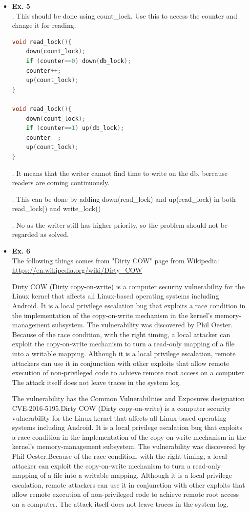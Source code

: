 \documentclass{article}
\begin{document}
\begin{itemize}
{\noindent }
\item {\bf Ex. 5}\\

{. This should be done using count\_lock. Use this to access the counter and change it for reading.}

\begin{lstlisting}[language=C]
void read_lock(){
    down(count_lock);
    if (counter==0) down(db_lock);
    counter++;
    up(count_lock);      
}

void read_lock(){
    down(count_lock);
    if (counter==1) up(db_lock);
    counter--;
    up(count_lock);      
}


\end{lstlisting}
{. It means that the writer cannot find time to write on the db, bercause readers are coming continuously.\\}

{. This can be done by adding down(read\_lock) and up(read\_lock) in both read\_lock() and write\_lock()\\}

{. No as the writer still has higher priority, so the problem should not be regarded as solved.}

\item {\bf Ex. 6}\\
The following things comes from "Dirty COW" page from Wikipedia: \url{https://en.wikipedia.org/wiki/Dirty_COW
}

Dirty COW (Dirty copy-on-write) is a computer security vulnerability for the Linux kernel that affects all Linux-based operating systems including Android. It is a local privilege escalation bug that exploits a race condition in the implementation of the copy-on-write mechanism in the kernel's memory-management subsystem. The vulnerability was discovered by Phil Oester. Because of the race condition, with the right timing, a local attacker can exploit the copy-on-write mechanism to turn a read-only mapping of a file into a writable mapping. Although it is a local privilege escalation, remote attackers can use it in conjunction with other exploits that allow remote execution of non-privileged code to achieve remote root access on a computer. The attack itself does not leave traces in the system log.

The vulnerability has the Common Vulnerabilities and Exposures designation CVE-2016-5195.Dirty COW (Dirty copy-on-write) is a computer security vulnerability for the Linux kernel that affects all Linux-based operating systems including Android. It is a local privilege escalation bug that exploits a race condition in the implementation of the copy-on-write mechanism in the kernel's memory-management subsystem. The vulnerability was discovered by Phil Oester.Because of the race condition, with the right timing, a local attacker can exploit the copy-on-write mechanism to turn a read-only mapping of a file into a writable mapping. Although it is a local privilege escalation, remote attackers can use it in conjunction with other exploits that allow remote execution of non-privileged code to achieve remote root access on a computer. The attack itself does not leave traces in the system log.


\end{itemize}
\end{document}
